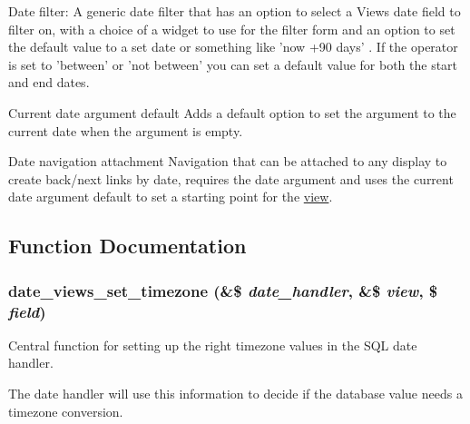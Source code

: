 Date filter: A generic date filter that has an option to select a Views date field to filter on, with a choice of a widget to use for the filter form and an option to set the default value to a set date or something like 'now +90 days' . If the operator is set to 'between' or 'not between' you can set a default value for both the start and end dates.

Current date argument default Adds a default option to set the argument to the current date when the argument is empty.

Date navigation attachment Navigation that can be attached to any display to create back/next links by date, requires the date argument and uses the current date argument default to set a starting point for the \hyperlink{classview}{view}. 

\subsection{Function Documentation}
\hypertarget{date__views_8views_8inc_a0e1c5073d0a78a816eb80e199b9be3c9}{
\subsubsection[{date\_\-views\_\-set\_\-timezone}]{\setlength{\rightskip}{0pt plus 5cm}date\_\-views\_\-set\_\-timezone (\&\$ {\em date\_\-handler}, \/  \&\$ {\em view}, \/  \$ {\em field})}}
\label{date__views_8views_8inc_a0e1c5073d0a78a816eb80e199b9be3c9}
Central function for setting up the right timezone values in the SQL date handler.

The date handler will use this information to decide if the database value needs a timezone conversion.

